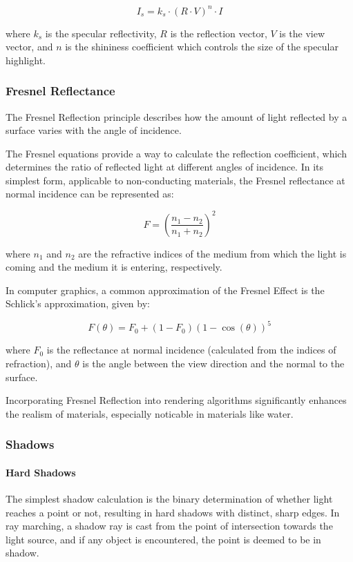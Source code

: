 \begin{equation}
\label{specular}
I_s = k_s \cdot (R \cdot V)^n \cdot I
\end{equation}

where $k_s$ is the specular reflectivity, $R$ is the reflection vector, $V$ is the view vector, and $n$ is the shininess coefficient which controls the size of the specular highlight.

\subsubsection{Fresnel Reflectance}
\label{Fresnel}

The Fresnel Reflection principle describes how the amount of light reflected by a surface varies with the angle of incidence. 

The Fresnel equations provide a way to calculate the reflection coefficient, which determines the ratio of reflected light at different angles of incidence. In its simplest form, applicable to non-conducting materials, the Fresnel reflectance at normal incidence can be represented as:

\begin{equation}
F = \left( \frac{n_1 - n_2}{n_1 + n_2} \right)^2
\end{equation}

where $n_1$ and  $n_2$ are the refractive indices of the medium from which the light is coming and the medium it is entering, respectively.

In computer graphics, a common approximation of the Fresnel Effect is the Schlick's approximation, given by:

\begin{equation}
\label{schlick}
F(\theta) = F_0 + (1 - F_0)(1 - \cos(\theta))^5
\end{equation}

where $F_0$  is the reflectance at normal incidence (calculated from the indices of refraction), and  $\theta$  is the angle between the view direction and the normal to the surface.

Incorporating Fresnel Reflection into rendering algorithms significantly enhances the realism of materials, especially noticable in materials like water. 

\subsubsection{Shadows}
\label{Shadows}

\paragraph{Hard Shadows}
The simplest shadow calculation is the binary determination of whether light reaches a point or not, resulting in hard shadows with distinct, sharp edges. In ray marching, a shadow ray is cast from the point of intersection towards the light source, and if any object is encountered, the point is deemed to be in shadow.

